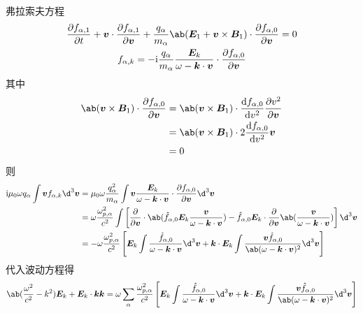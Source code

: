 弗拉索夫方程
\begin{equation}\begin{gathered}
\pdv{f_{\alpha,1}}{t}
+ \vector{v} \cdot \pdv{f_{\alpha,1}}{\vector{v}}
+ \frac{q_\alpha}{m_\alpha} \ab(\vector{E}_1 + \vector{v}\times\vector{B}_1)
\cdot \pdv{f_{\alpha,0}}{\vector{v}}
= 0 \\
f_{\alpha,k} = -\im \frac{q_\alpha}{m_\alpha}
\frac{\vector{E}_k}{\omega - \vector{k}\cdot\vector{v}}
\cdot \pdv{f_{\alpha,0}}{\vector{v}}
\end{gathered}\end{equation}
其中
\begin{equation}\begin{aligned}
\ab(\vector{v} \times \vector{B}_1) \cdot \pdv{f_{\alpha,0}}{\vector{v}}
&= \ab(\vector{v} \times \vector{B}_1)
\cdot \odv{f_{\alpha,0}}{v^2} \pdv{v^2}{\vector{v}} \\
&= \ab(\vector{v} \times \vector{B}_1)
\cdot 2 \odv{f_{\alpha,0}}{v^2} \vector{v} \\
&= 0
\end{aligned}\end{equation}
则
\begin{equation}\begin{aligned}
\im\mu_0\omega q_\alpha \int \vector{v} f_{\alpha,k} \d^3\vector{v}
&= \mu_0\omega \frac{q_\alpha^2}{m_\alpha}
\int \vector{v} \frac{\vector{E}_k}{\omega - \vector{k}\cdot\vector{v}}
\cdot \pdv{f_{\alpha,0}}{\vector{v}} \d^3\vector{v} \\
&= \omega \frac{\omega_{p,\alpha}^2}{c^2} \int \left[
\pdv{}{\vector{v}} \cdot \ab(
    \hat{f}_{\alpha,0} \vector{E}_k
    \frac{\vector{v}}{\omega - \vector{k}\cdot\vector{v}}
)
    - \hat{f}_{\alpha,0} \vector{E}_k \cdot
    \pdv*{\ab(\frac{\vector{v}}{\omega-\vector{k}\cdot\vector{v}})}{\vector{v}}
\right] \d^3\vector{v} \\
&= - \omega \frac{\omega_{p,\alpha}^2}{c^2} \left[
\vector{E}_k \int
\frac{\hat{f}_{\alpha,0}}{\omega - \vector{k}\cdot\vector{v}}
\d^3\vector{v}
+ \vector{k} \cdot \vector{E}_k \int
\frac{\vector{v} \hat{f}_{\alpha,0}}
{\ab(\omega - \vector{k}\cdot\vector{v})^2}
\d^3\vector{v}
\right]
\end{aligned}\end{equation}
代入波动方程得
\begin{equation}\begin{aligned}
\ab(\frac{\omega^2}{c^2} - k^2) \vector{E}_k
+ \vector{E}_k\cdot\vector{k}\vector{k}
= \omega \sum_\alpha \frac{\omega_{p,\alpha}^2}{c^2}
\left[
\vector{E}_k \int
\frac{\hat{f}_{\alpha,0}}{\omega - \vector{k}\cdot\vector{v}}
\d^3\vector{v}
+ \vector{k} \cdot \vector{E}_k \int
\frac{\vector{v} \hat{f}_{\alpha,0}}
{\ab(\omega - \vector{k}\cdot\vector{v})^2}
\d^3\vector{v}
\right]
\end{aligned}\end{equation}
